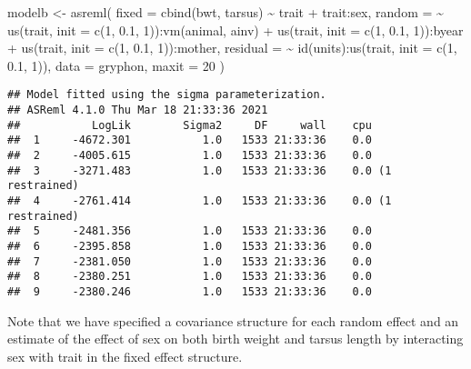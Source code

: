 \documentclass[
  12pt,
]{book}
\newenvironment{Shaded}{\begin{snugshade}}{\end{snugshade}}
\newcommand{\AttributeTok}[1]{\textcolor[rgb]{0.77,0.63,0.00}{#1}}
\newcommand{\DecValTok}[1]{\textcolor[rgb]{0.00,0.00,0.81}{#1}}
\newcommand{\FloatTok}[1]{\textcolor[rgb]{0.00,0.00,0.81}{#1}}
\newcommand{\FunctionTok}[1]{\textcolor[rgb]{0.00,0.00,0.00}{#1}}
\newcommand{\NormalTok}[1]{#1}
\newcommand{\OtherTok}[1]{\textcolor[rgb]{0.56,0.35,0.01}{#1}}
\newcommand{\SpecialCharTok}[1]{\textcolor[rgb]{0.00,0.00,0.00}{#1}}
\begin{document}
\begin{Shaded}
\begin{Highlighting}[]
\NormalTok{modelb }\OtherTok{\textless{}{-}} \FunctionTok{asreml}\NormalTok{(}
  \AttributeTok{fixed =} \FunctionTok{cbind}\NormalTok{(bwt, tarsus) }\SpecialCharTok{\textasciitilde{}}\NormalTok{ trait }\SpecialCharTok{+}\NormalTok{ trait}\SpecialCharTok{:}\NormalTok{sex,}
  \AttributeTok{random =} \SpecialCharTok{\textasciitilde{}} \FunctionTok{us}\NormalTok{(trait, }\AttributeTok{init =} \FunctionTok{c}\NormalTok{(}\DecValTok{1}\NormalTok{, }\FloatTok{0.1}\NormalTok{, }\DecValTok{1}\NormalTok{))}\SpecialCharTok{:}\FunctionTok{vm}\NormalTok{(animal, ainv) }\SpecialCharTok{+}
    \FunctionTok{us}\NormalTok{(trait, }\AttributeTok{init =} \FunctionTok{c}\NormalTok{(}\DecValTok{1}\NormalTok{, }\FloatTok{0.1}\NormalTok{, }\DecValTok{1}\NormalTok{))}\SpecialCharTok{:}\NormalTok{byear }\SpecialCharTok{+}
    \FunctionTok{us}\NormalTok{(trait, }\AttributeTok{init =} \FunctionTok{c}\NormalTok{(}\DecValTok{1}\NormalTok{, }\FloatTok{0.1}\NormalTok{, }\DecValTok{1}\NormalTok{))}\SpecialCharTok{:}\NormalTok{mother,}
  \AttributeTok{residual =} \SpecialCharTok{\textasciitilde{}} \FunctionTok{id}\NormalTok{(units)}\SpecialCharTok{:}\FunctionTok{us}\NormalTok{(trait, }\AttributeTok{init =} \FunctionTok{c}\NormalTok{(}\DecValTok{1}\NormalTok{, }\FloatTok{0.1}\NormalTok{, }\DecValTok{1}\NormalTok{)),}
  \AttributeTok{data =}\NormalTok{ gryphon,}
  \AttributeTok{maxit =} \DecValTok{20}
\NormalTok{)}
\end{Highlighting}
\end{Shaded}

\begin{verbatim}
## Model fitted using the sigma parameterization.
## ASReml 4.1.0 Thu Mar 18 21:33:36 2021
##           LogLik        Sigma2     DF     wall    cpu
##  1     -4672.301           1.0   1533 21:33:36    0.0
##  2     -4005.615           1.0   1533 21:33:36    0.0
##  3     -3271.483           1.0   1533 21:33:36    0.0 (1 restrained)
##  4     -2761.414           1.0   1533 21:33:36    0.0 (1 restrained)
##  5     -2481.356           1.0   1533 21:33:36    0.0
##  6     -2395.858           1.0   1533 21:33:36    0.0
##  7     -2381.050           1.0   1533 21:33:36    0.0
##  8     -2380.251           1.0   1533 21:33:36    0.0
##  9     -2380.246           1.0   1533 21:33:36    0.0
\end{verbatim}

Note that we have specified a covariance structure for each random effect and an estimate of the effect of sex on both birth weight and tarsus length by interacting sex with trait in the fixed effect structure.
\end{document}
